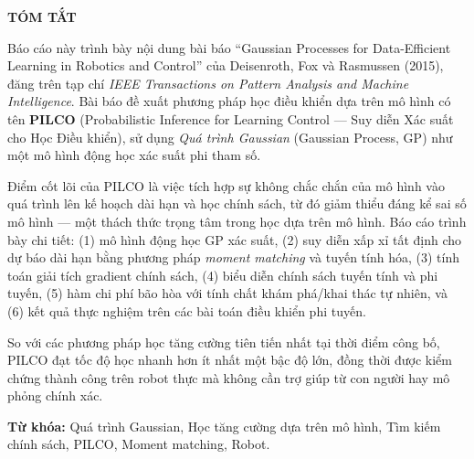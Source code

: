 \documentclass[12pt,a4paper]{article}
\theoremstyle{plain}
\theoremstyle{plain}
\theoremstyle{plain}
\theoremstyle{nonumberplain}
\numberwithin{equation}{section}
\numberwithin{figure}{section}
\begin{document}
\pagestyle{fancy}
\hypersetup{linkcolor=black}

\newpage
\thispagestyle{fancy}
\begin{center}
    \bf\large TÓM TẮT
\end{center}
\medskip
Báo cáo này trình bày nội dung bài báo ``Gaussian Processes for Data-Efficient Learning in Robotics and Control'' của Deisenroth, Fox và Rasmussen (2015), đăng trên tạp chí \textit{IEEE Transactions on Pattern Analysis and Machine Intelligence}. Bài báo đề xuất phương pháp học điều khiển dựa trên mô hình có tên \textbf{PILCO} (Probabilistic Inference for Learning Control — Suy diễn Xác suất cho Học Điều khiển), sử dụng \textit{Quá trình Gaussian} (Gaussian Process, GP) như một mô hình động học xác suất phi tham số.

\medskip
Điểm cốt lõi của PILCO là việc tích hợp sự không chắc chắn của mô hình vào quá trình lên kế hoạch dài hạn và học chính sách, từ đó giảm thiểu đáng kể sai số mô hình — một thách thức trọng tâm trong học dựa trên mô hình. Báo cáo trình bày chi tiết: (1) mô hình động học GP xác suất, (2) suy diễn xấp xỉ tất định cho dự báo dài hạn bằng phương pháp \textit{moment matching} và tuyến tính hóa, (3) tính toán giải tích gradient chính sách, (4) biểu diễn chính sách tuyến tính và phi tuyến, (5) hàm chi phí bão hòa với tính chất khám phá/khai thác tự nhiên, và (6) kết quả thực nghiệm trên các bài toán điều khiển phi tuyến.

\medskip
So với các phương pháp học tăng cường tiên tiến nhất tại thời điểm công bố, PILCO đạt tốc độ học nhanh hơn ít nhất một bậc độ lớn, đồng thời được kiểm chứng thành công trên robot thực mà không cần trợ giúp từ con người hay mô phỏng chính xác.

\medskip
\noindent\textbf{Từ khóa:} Quá trình Gaussian, Học tăng cường dựa trên mô hình, Tìm kiếm chính sách, PILCO, Moment matching, Robot.

\newpage

\tableofcontents
\vspace{2cm}

\renewcommand{\listfigurename}{Danh mục hình ảnh}
\listoffigures
\hypersetup{linkcolor=blue}
\newpage










\newpage

\renewcommand{\refname}{Tài liệu tham khảo}


\end{document}
